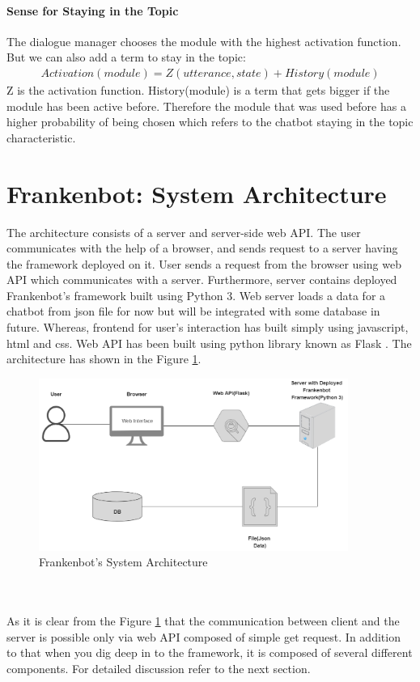 \paragraph*{Sense for Staying in the Topic}
The dialogue manager chooses the module with the highest activation function. But we can also add a term to stay in the topic: 
\begin{align*}
 Activation(module) = Z(utterance, state) + History(module)
\end{align*} 
Z is the activation function. History(module) is a term that gets bigger if the module has been active before. Therefore the module that was used before has a higher probability of being chosen which refers to the chatbot staying in the topic characteristic.

\section{Frankenbot: System Architecture}
The architecture consists of a server and server-side web API. The user communicates with the help of a browser, and sends request to a server having the framework deployed on it. User sends a request from the browser using web API which communicates with a server. Furthermore, server contains deployed Frankenbot's framework built using Python 3. Web server loads a data for a chatbot from json file for now but will be integrated with some database in future. Whereas, frontend for user's interaction has built simply using javascript, html and css. Web API has been built using python library known as Flask \cite{flask}. The architecture has shown in the Figure \ref{fig:sysArch}.

\begin{figure}[!h]
    \centering
    \includegraphics[width=0.9\textwidth]{img/System_Architecture.PNG}
    \caption{Frankenbot's System Architecture}
    \label{fig:sysArch}
\end{figure} 
\\~\\
As it is clear from the Figure \ref{fig:sysArch} that the communication between client and the server is possible only via web API composed of simple get request. In addition to that when you dig deep in to the framework, it is composed of several different components. For detailed discussion refer to the next section.

